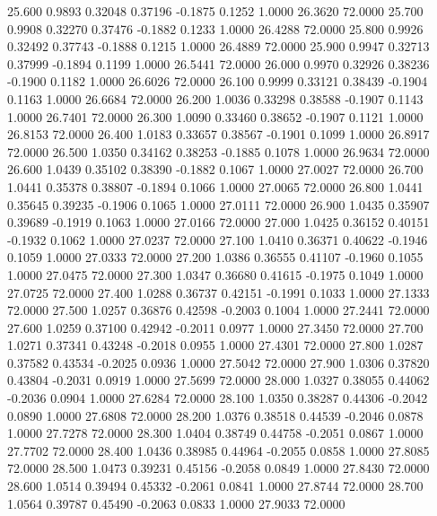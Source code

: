   25.600   0.9893   0.32048   0.37196  -0.1875   0.1252   1.0000  26.3620  72.0000
  25.700   0.9908   0.32270   0.37476  -0.1882   0.1233   1.0000  26.4288  72.0000
  25.800   0.9926   0.32492   0.37743  -0.1888   0.1215   1.0000  26.4889  72.0000
  25.900   0.9947   0.32713   0.37999  -0.1894   0.1199   1.0000  26.5441  72.0000
  26.000   0.9970   0.32926   0.38236  -0.1900   0.1182   1.0000  26.6026  72.0000
  26.100   0.9999   0.33121   0.38439  -0.1904   0.1163   1.0000  26.6684  72.0000
  26.200   1.0036   0.33298   0.38588  -0.1907   0.1143   1.0000  26.7401  72.0000
  26.300   1.0090   0.33460   0.38652  -0.1907   0.1121   1.0000  26.8153  72.0000
  26.400   1.0183   0.33657   0.38567  -0.1901   0.1099   1.0000  26.8917  72.0000
  26.500   1.0350   0.34162   0.38253  -0.1885   0.1078   1.0000  26.9634  72.0000
  26.600   1.0439   0.35102   0.38390  -0.1882   0.1067   1.0000  27.0027  72.0000
  26.700   1.0441   0.35378   0.38807  -0.1894   0.1066   1.0000  27.0065  72.0000
  26.800   1.0441   0.35645   0.39235  -0.1906   0.1065   1.0000  27.0111  72.0000
  26.900   1.0435   0.35907   0.39689  -0.1919   0.1063   1.0000  27.0166  72.0000
  27.000   1.0425   0.36152   0.40151  -0.1932   0.1062   1.0000  27.0237  72.0000
  27.100   1.0410   0.36371   0.40622  -0.1946   0.1059   1.0000  27.0333  72.0000
  27.200   1.0386   0.36555   0.41107  -0.1960   0.1055   1.0000  27.0475  72.0000
  27.300   1.0347   0.36680   0.41615  -0.1975   0.1049   1.0000  27.0725  72.0000
  27.400   1.0288   0.36737   0.42151  -0.1991   0.1033   1.0000  27.1333  72.0000
  27.500   1.0257   0.36876   0.42598  -0.2003   0.1004   1.0000  27.2441  72.0000
  27.600   1.0259   0.37100   0.42942  -0.2011   0.0977   1.0000  27.3450  72.0000
  27.700   1.0271   0.37341   0.43248  -0.2018   0.0955   1.0000  27.4301  72.0000
  27.800   1.0287   0.37582   0.43534  -0.2025   0.0936   1.0000  27.5042  72.0000
  27.900   1.0306   0.37820   0.43804  -0.2031   0.0919   1.0000  27.5699  72.0000
  28.000   1.0327   0.38055   0.44062  -0.2036   0.0904   1.0000  27.6284  72.0000
  28.100   1.0350   0.38287   0.44306  -0.2042   0.0890   1.0000  27.6808  72.0000
  28.200   1.0376   0.38518   0.44539  -0.2046   0.0878   1.0000  27.7278  72.0000
  28.300   1.0404   0.38749   0.44758  -0.2051   0.0867   1.0000  27.7702  72.0000
  28.400   1.0436   0.38985   0.44964  -0.2055   0.0858   1.0000  27.8085  72.0000
  28.500   1.0473   0.39231   0.45156  -0.2058   0.0849   1.0000  27.8430  72.0000
  28.600   1.0514   0.39494   0.45332  -0.2061   0.0841   1.0000  27.8744  72.0000
  28.700   1.0564   0.39787   0.45490  -0.2063   0.0833   1.0000  27.9033  72.0000

